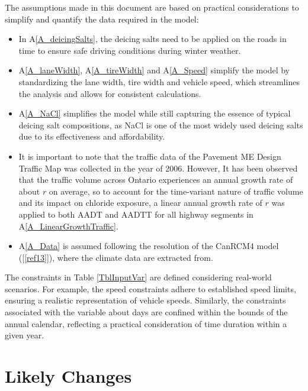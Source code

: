 \documentclass[12pt]{article}
\newcommand{\aref}[1]{A\ref{#1}}
\newcommand{\reref}[1]{\ref{#1}}
\begin{document}
The assumptions made in this document are based on practical considerations to simplify and quantify the data required in the model:
\begin{itemize} 
\item In \aref{A_deicingSalts}, the deicing salts need to be applied on the roads in time to ensure safe driving conditions during winter weather. 
\item \aref{A_laneWidth}, \aref{A_tireWidth} and \aref{A_Speed} simplify the model by standardizing the lane width, tire width and vehicle speed, which streamlines the analysis and allows for consistent calculations.
\item \aref{A_NaCl} simplifies the model while still capturing the essence of typical deicing salt compositions, as NaCl is one of the most widely used deicing salts due to its effectiveness and affordability.
\item It is important to note that the traffic data of the Pavement ME Design Traffic Map was collected in the year of 2006. However, It has been observed that the traffic volume across Ontario experiences an annual growth rate of about $r$ on average, so to account for the time-variant nature of traffic volume and its impact on chloride exposure, a linear annual growth rate of $r$ was applied to both AADT and AADTT for all highway segments in \aref{A_LinearGrowthTraffic}. 
\item \aref{A_Data} is assumed following the resolution of the CanRCM4 model ([\reref{ref13}]), where the climate data are extracted from.

\end{itemize}

The constraints in Table \ref{TblInputVar} are defined considering real-world scenarios. For example,  the speed constraints adhere to established speed limits, ensuring a realistic representation of vehicle speeds. Similarly, the constraints associated with the variable about days are confined within the bounds of the annual calendar, reflecting a practical consideration of time duration within a given year.


\section{Likely Changes}    
\end{document}
